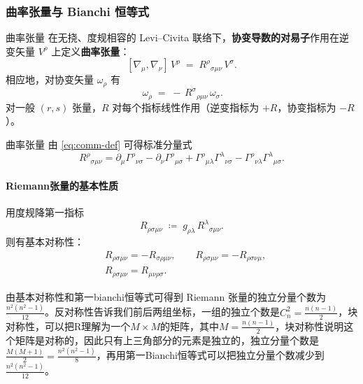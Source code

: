  \subsubsection{曲率张量与 Bianchi 恒等式}

  \begin{definition}{曲率张量}
    在无挠、度规相容的 Levi--Civita 联络下，\textbf{协变导数的对易子}作用在逆变矢量 $V^\rho$ 上定义\textbf{曲率张量}：
  \begin{equation}\label{eq:comm-def}
  [\nabla_\mu,\nabla_\nu]\,V^\rho
  \;=\; R^{\rho}{}_{\sigma\mu\nu}\,V^\sigma.
  \end{equation}
  相应地，对协变矢量 $\omega_\rho$ 有
  \begin{equation}
  [\nabla_\mu,\nabla_\nu]\,\omega_\rho
  \;=\; -\,R^{\sigma}{}_{\rho\mu\nu}\,\omega_\sigma.
  \end{equation}
  对一般 $(r,s)$ 张量，$R$ 对每个指标线性作用（逆变指标为 $+R$，协变指标为 $-R$）。

  \end{definition}
  
  
  \begin{theorem}{曲率张量}
      由 \eqref{eq:comm-def} 可得标准分量式
  \begin{equation}\label{eq:riemann-gamma}
  R^{\rho}{}_{\sigma\mu\nu}
  = \partial_\mu \Gamma^{\rho}{}_{\nu\sigma}
  - \partial_\nu \Gamma^{\rho}{}_{\mu\sigma}
  + \Gamma^{\rho}{}_{\mu\lambda}\Gamma^{\lambda}{}_{\nu\sigma}
  - \Gamma^{\rho}{}_{\nu\lambda}\Gamma^{\lambda}{}_{\mu\sigma}.
  \end{equation}
  \end{theorem}



  \paragraph{Riemann张量的基本性质}
  用度规降第一指标
  \[
  R_{\rho\sigma\mu\nu} \;\coloneqq\; g_{\rho\lambda}\,R^{\lambda}{}_{\sigma\mu\nu}.
  \]
  则有基本对称性：
  \begin{align}
  &R_{\rho\sigma\mu\nu} = - R_{\sigma\rho\mu\nu},\qquad
  R_{\rho\sigma\mu\nu} = - R_{\rho\sigma\nu\mu},\\
  &R_{\rho\sigma\mu\nu} = R_{\mu\nu\rho\sigma}.
  \end{align}

  \begin{derivationnote}[曲率张量的独立分量个数]
由基本对称性和第一bianchi恒等式可得到 Riemann 张量的独立分量个数为 $\frac{n^2(n^2-1)}{12}$。反对称性告诉我们前后两组坐标，一组的独立个数是$C^2_n = \frac{n(n-1)}{2}$，块对称性，可以把R理解为一个$M \times M$的矩阵，其中$M = \frac{n(n-1)}{2}$，块对称性说明这个矩阵是对称的，因此只有上三角部分的元素是独立的，独立分量个数是$\frac{M(M+1)}{2} = \frac{n^2(n^2-1)}{8}$，再用第一Bianchi恒等式可以把独立分量个数减少到$\frac{n^2(n^2-1)}{12}$。
  \end{derivationnote}

